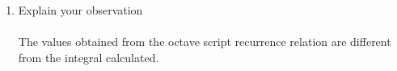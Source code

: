 \documentclass{article}
\begin{document}
\begin{enumerate}
\begin{enumerate}
\vspace{2cm}

\item Explain your observation \\ \\
 The values obtained from the octave script recurrence relation are different from the integral calculated.
\end{enumerate}

\end{enumerate}
\end{document}
